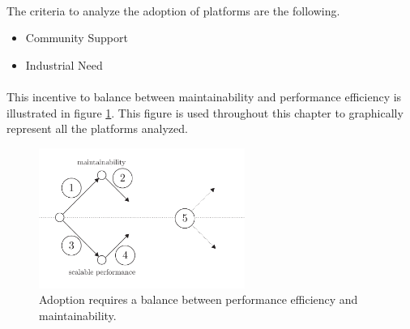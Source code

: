 \paragraph{}

The criteria to analyze the adoption of platforms are the following.

\begin{itemize}
\item Community Support
\item Industrial Need
\end{itemize}

\paragraph{}

This incentive to balance between maintainability and performance efficiency is illustrated in figure \ref{fig:state-of-the-art}.
This figure is used throughout this chapter to graphically represent all the platforms analyzed.

\begin{figure}[h!]
\begin{center}
\includegraphics[width=0.6\textwidth]{../ressources/state-of-the-art.pdf}
\end{center}
\caption{Adoption requires a balance between performance efficiency and maintainability.}
\label{fig:state-of-the-art}
\end{figure}








